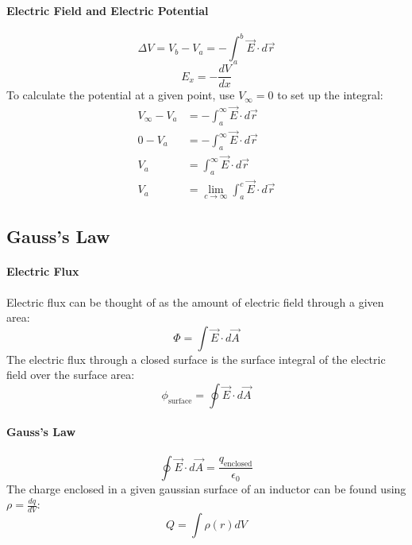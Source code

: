 \documentclass{article}
\begin{document}
            \paragraph{Electric Field and Electric Potential}
            \begin{equation}
                \Delta V = V_b - V_a = - \int_a^b \vec{E} \cdot d\vec{r}
            \end{equation}
            \begin{equation}
                E_x = - \frac{dV}{dx}
            \end{equation}
            To calculate the potential at a given point, use $V_\infty = 0$ to set up the integral:
            \begin{align}
                V_\infty - V_a &= - \int_a^\infty \vec{E} \cdot d\vec{r} \nonumber\\
                0 - V_a &= - \int_a^\infty \vec{E} \cdot d\vec{r} \nonumber\\
                V_a &= \int_a^\infty \vec{E} \cdot d\vec{r} \nonumber\\
                V_a &= \lim_{c \to \infty} \int_a^c \vec{E} \cdot d\vec{r} \nonumber
            \end{align}

        \subsection{Gauss's Law}
            \paragraph{Electric Flux}
            Electric flux can be thought of as the amount of electric field through a given area:
            \begin{equation}
                \Phi = \int \vec{E} \cdot d\vec{A}
            \end{equation}
            The electric flux through a closed surface is the surface integral of the electric field over the surface area:
            \begin{equation}
                \phi_\text{surface} = \oint \vec{E} \cdot d\vec{A}
            \end{equation}

            \paragraph{Gauss's Law}
            \begin{equation}
                \oint \vec{E} \cdot d\vec{A} = \frac{q_\text{enclosed}}{\epsilon_0}
            \end{equation}
            The charge enclosed in a given gaussian surface of an inductor can be found using $\rho = \frac{dq}{dV}$:
            \begin{equation}
                Q = \int \rho(r) dV
            \end{equation}
\end{document}
